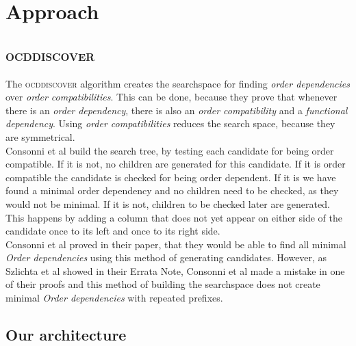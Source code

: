 
\section{Approach}\label{sec:approach}
 
\subsection{\textsc{ocddiscover}}
The \textsc{ocddiscover} algorithm creates the searchspace for finding \emph{order dependencies} over \emph{order compatibilities}.
This can be done, because they prove that whenever there is an \emph{order dependency}, there is also an \emph{order compatibility} and a \emph{functional dependency}.
Using \emph{order compatibilities} reduces the search space, because they are symmetrical. \\
Consonni et al build the search tree, by testing each candidate for being order compatible. 
If it is not, no children are generated for this candidate.
If it is order compatible the candidate is checked for being order dependent. 
If it is we have found a minimal order dependency and no children need to be checked, as they would not be minimal.
If it is not, children to be checked later are generated. 
This happens by adding a column that does not yet appear on either side of the candidate once to its left and once to its right side. \\
Consonni et al proved in their paper, that they would be able to find all minimal \emph{Order dependencies} using this method of generating candidates.
However, as Szlichta et al showed in their Errata Note, Consonni et al made a mistake in one of their proofs and this method of building the searchspace does not create minimal \emph{Order dependencies} with repeated prefixes.

\subsection{Our architecture}
